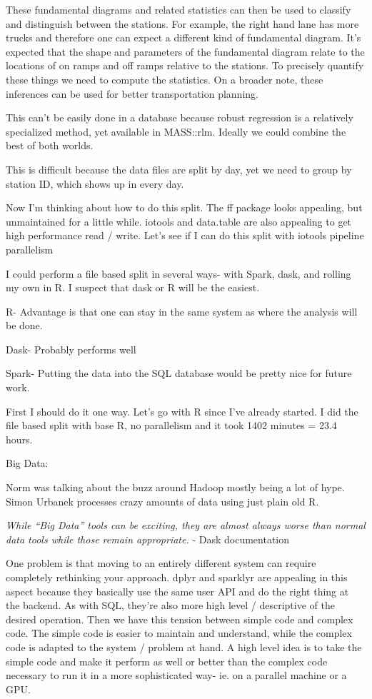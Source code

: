 \documentclass[12pt]{article}
\begin{document}
These fundamental diagrams and related statistics can then be used to
classify and distinguish between the stations. For example, the right hand
lane has more trucks and therefore one can expect a different kind of
fundamental diagram. It's expected that the shape and parameters of the
fundamental diagram relate to the locations of on ramps and off ramps
relative to the stations. To precisely quantify these things we need to
compute the statistics. On a broader note, these inferences can be used for
better transportation planning.

This can't be easily done in a database because robust regression is
a relatively specialized method, yet available in MASS::rlm.
Ideally we could combine the best of both worlds.

This is difficult because the data files are split by day, yet we
need to group by station ID, which shows up in every day.

Now I'm thinking about how to do this split. The ff package looks
appealing, but unmaintained for a little while. iotools and data.table
are also appealing to get high performance read / write. Let's see if I
can do this split with iotools pipeline parallelism

I could perform a file based split in several ways- with Spark, dask, and
rolling my own in R. I suspect that dask or R will be the easiest.

R- Advantage is that one can stay in the same system as where the analysis
will be done. 

Dask- Probably performs well

Spark- Putting the data into the SQL database would be pretty nice for
future work.

First I should do it one way. Let's go with R since I've already started.
I did the file based split with base R, no parallelism and it took 1402 minutes = 23.4 hours.

Big Data:

Norm was talking about the buzz around Hadoop mostly being a lot of hype.
Simon Urbanek processes crazy amounts of data using just plain old R.

\emph{While “Big Data” tools can be exciting, they are almost always worse than
normal data tools while those remain appropriate.} - Dask documentation

One problem is that moving to an entirely different system can require
completely rethinking your approach. dplyr and sparklyr are appealing in this
aspect because they basically use the same user API and do the right
thing at the backend. As with SQL, they're also more high level / descriptive of the
desired operation. Then we have this tension between simple code and
complex code. The simple code is easier to maintain and understand, while
the complex code is adapted to the system / problem at hand. A high level
idea is to take the simple code and make it perform as well or better than
the complex code necessary to run it in a more sophisticated way- ie. on a
parallel machine or a GPU.
\end{document}
